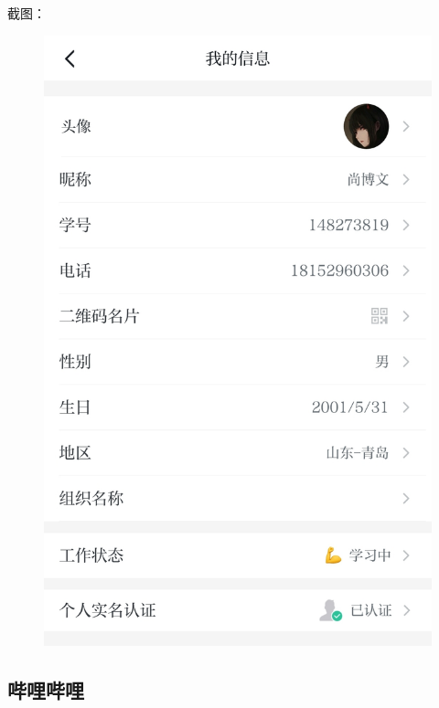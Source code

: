 \documentclass{article}
\begin{document}
截图：
\begin{figure}[H]
    \centering
    \includegraphics[scale=0.28]{xxqg}
    \label{fig:xxqg}
\end{figure}

\subsection{哔哩哔哩}
\end{document}

